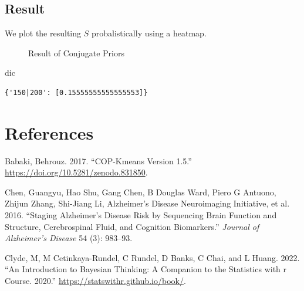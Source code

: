 \documentclass[
  letterpaper,
  DIV=11,
  numbers=noendperiod]{scrreprt}
\newenvironment{Shaded}{\begin{snugshade}}{\end{snugshade}}
\newcommand{\NormalTok}[1]{\textcolor[rgb]{0.00,0.23,0.31}{#1}}
\newlength{\cslhangindent}
\newenvironment{CSLReferences}[2] %
 {\begin{list}{}{%
  \setlength{\itemindent}{0pt}
  \setlength{\leftmargin}{0pt}
  \setlength{\parsep}{0pt}
  \ifodd #1
   \setlength{\leftmargin}{\cslhangindent}
   \setlength{\itemindent}{-1\cslhangindent}
  \fi
  \setlength{\itemsep}{#2\baselineskip}}}
 {\end{list}}
\begin{document}
\section{Result}\label{result-3}

We plot the resulting \(S\) probalistically using a heatmap.

\begin{figure}


\caption{\label{fig-conjugate_priors-result}Result of Conjugate Priors}

\end{figure}%

\begin{Shaded}
\begin{Highlighting}[]
\NormalTok{dic}
\end{Highlighting}
\end{Shaded}

\begin{verbatim}
{'150|200': [0.15555555555555553]}
\end{verbatim}


\chapter*{References}\label{references}


\label{refs}
\begin{CSLReferences}{1}{0}
Babaki, Behrouz. 2017. {``COP-Kmeans Version 1.5.''}
\url{https://doi.org/10.5281/zenodo.831850}.

Chen, Guangyu, Hao Shu, Gang Chen, B Douglas Ward, Piero G Antuono,
Zhijun Zhang, Shi-Jiang Li, Alzheimer's Disease Neuroimaging Initiative,
et al. 2016. {``Staging Alzheimer's Disease Risk by Sequencing Brain
Function and Structure, Cerebrospinal Fluid, and Cognition
Biomarkers.''} \emph{Journal of Alzheimer's Disease} 54 (3): 983--93.

Clyde, M, M Cetinkaya-Rundel, C Rundel, D Banks, C Chai, and L Huang.
2022. {``An Introduction to Bayesian Thinking: A Companion to the
Statistics with r Course. 2020.''}
\url{https://statswithr.github.io/book/}.

\end{CSLReferences}
\end{document}
